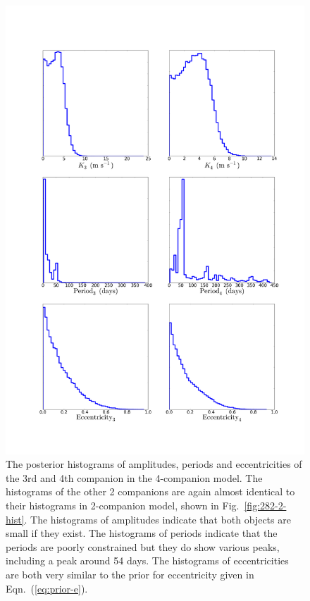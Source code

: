 \documentclass[letterpaper, preprint]{aastex}
\begin{document}
\begin{figure}
 \centering
 \includegraphics[width=0.80\linewidth]{282-4-hist.png}
 \caption{The posterior histograms of amplitudes, periods and eccentricities of the 3rd and 4th companion in the 4-companion model. The histograms of the other 2 companions are again almost identical to their histograms in 2-companion model, shown in Fig.~\ref{fig:282-2-hist}. The histograms of amplitudes indicate that both objects are small if they exist. The histograms of periods indicate that the periods are poorly constrained but they do show various peaks, including a peak around 54 days. The histograms of eccentricities are both very similar to the prior for eccentricity given in Eqn.~(\ref{eq:prior-e}).}
 \label{fig:282-4-hist}
\end{figure}
\end{document}
